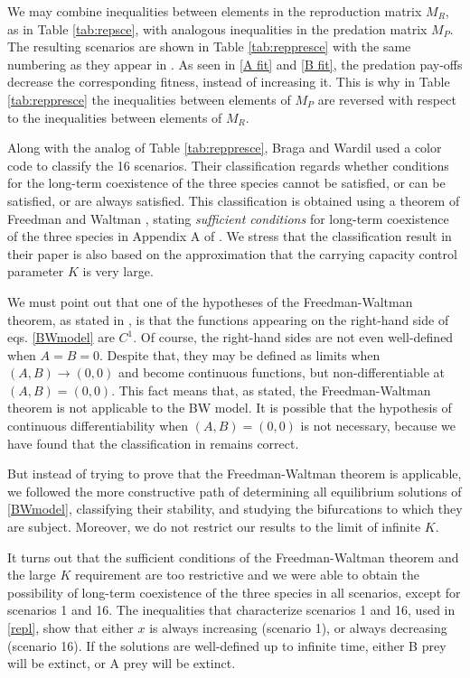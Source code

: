 \documentclass[12pt]{article}
\theoremstyle{definition}
\begin{document}
We may combine inequalities between elements in the reproduction matrix $M_R$, as in Table \ref{tab:repsce}, with analogous inequalities in the predation matrix $M_P$. The resulting scenarios are shown in Table \ref{tab:reppresce} with the same numbering as they appear in \cite{bw}. As seen in \eqref{A fit} and \eqref{B fit}, the predation pay-offs decrease the corresponding fitness, instead of increasing it. This is why in Table \ref{tab:reppresce} the inequalities between elements of $M_P$ are reversed with respect to the inequalities between elements of $M_R$.

Along with the analog of Table \ref{tab:reppresce}, Braga and Wardil \cite{bw} used a color code to classify the 16 scenarios. Their classification regards whether conditions for the long-term coexistence of the three species cannot be satisfied, or can be satisfied, or are always satisfied. This classification is obtained using a theorem of Freedman and Waltman \cite{frewal}, stating \emph{sufficient conditions} for long-term coexistence of the three species in Appendix A of \cite{bw}. We stress that the classification result in their paper is also based on the approximation that the carrying capacity control parameter $K$ is very large. 

We must point out that one of the hypotheses of the Freedman-Waltman theorem, as stated in \cite{bw, frewal}, is that the functions appearing on the right-hand side of eqs. \eqref{BWmodel} are $C^1$. Of course, the right-hand sides are not even well-defined when $A=B=0$. Despite that, they may be defined as limits when $(A,B) \rightarrow (0,0)$ and become continuous functions, but non-differentiable at $(A,B)=(0,0)$. This fact means that, as stated, the Freedman-Waltman theorem is not applicable to the BW model. It is possible that the hypothesis of continuous differentiability when $(A,B)=(0,0)$ is not necessary, because we have found that the classification in \cite{bw} remains correct. 

But instead of trying to prove that the Freedman-Waltman theorem is applicable, we followed the more constructive path of determining all equilibrium solutions of \eqref{BWmodel}, classifying their stability, and studying the bifurcations to which they are subject. Moreover, we do not restrict our results to the limit of infinite $K$. 

It turns out that the sufficient conditions of the Freedman-Waltman theorem and the large $K$ requirement are too restrictive and we were able to obtain the possibility of long-term coexistence of the three species in all scenarios, except for scenarios 1 and 16. The inequalities that characterize scenarios 1 and 16, used in \eqref{repl}, show that either $x$ is always increasing (scenario 1), or always decreasing (scenario 16). If the solutions are well-defined up to infinite time, either B prey will be extinct, or A prey will be extinct.
\end{document}
